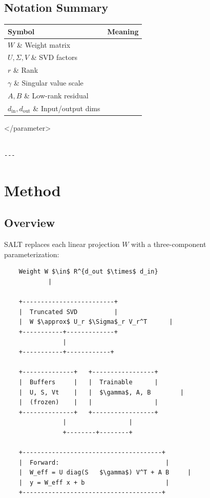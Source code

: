 \subsection{Notation Summary}

\begin{table}[H]
\centering
\small
\begin{tabular}{ll}
\toprule
\textbf{Symbol} & \textbf{Meaning} \\
\midrule
$W$ \& Weight matrix \\
$U, \Sigma, V$ \& SVD factors \\
$r$ \& Rank \\
$\gamma$ \& Singular value scale \\
$A, B$ \& Low-rank residual \\
$d_\text{in}, d_\text{out}$ \& Input/output dims \\
\bottomrule
\end{tabular}
\end{table}
</parameter>
\begin{lstlisting}

---
\end{lstlisting}


\section{Method}

\subsection{Overview}

SALT replaces each linear projection $W$ with a three-component parameterization:

\begin{lstlisting}
    Weight W $\in$ R^{d_out $\times$ d_in}
            |
             
    +-------------------------+
    |  Truncated SVD          |
    |  W $\approx$ U_r $\Sigma$_r V_r^T      |
    +-----------+-------------+
                |
    +-----------+------------+
                              
    +--------------+   +-----------------+
    |  Buffers     |   |  Trainable      |
    |  U, S, Vt    |   |  $\gamma$, A, B        |
    |  (frozen)    |   |                 |
    +--------------+   +-----------------+
                |                 |
                +--------+--------+
                          
    +--------------------------------------+
    |  Forward:                             |
    |  W_eff = U diag(S   $\gamma$) V^T + A B     |
    |  y = W_eff x + b                      |
    +--------------------------------------+
\end{lstlisting}

